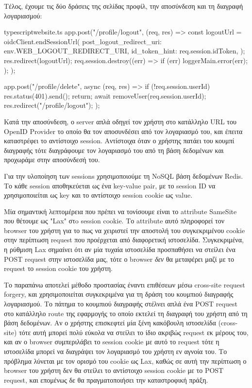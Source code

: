 \documentclass[../thesis.tex]{subfiles}
\begin{document}
Τέλος, έχουμε τις δύο δράσεις της σελίδας προφίλ, την αποσύνδεση και τη διαγραφή λογαριασμού:

\begin{codeblock}{typescript}{website.ts}
  app.post("/profile/logout", (req, res) => {
    const logoutUrl = oidcClient.endSessionUrl({
      post_logout_redirect_uri: env.WEB_LOGOUT_REDIRECT_URI,
      id_token_hint: req.session.idToken,
    });
    res.redirect(logoutUrl);
    req.session.destroy((err) => {
      if (err) loggerMain.error(err);
    });
  });

  app.post("/profile/delete", async (req, res) => {
    if (!req.session.userId) {
      res.status(401).send();
      return;
    }
    await removeUser(req.session.userId);
    res.redirect("/profile/logout");
  });
\end{codeblock}

Κατά την αποσύνδεση, ο server απλά οδηγεί τον χρήστη στο κατάλληλο URL του OpenID Provider το οποίο θα τον αποσυνδέσει από τον λογαριασμό του, και έπειτα καταστρέφει το αντίστοιχο session.
Αντίστοιχα όταν ο χρήστης πατάει του κουμπί διαγραφής τότε διαγράφουμε τον λογαριασμό του από τη βάση δεδομένων και προχωράμε στην αποσύνδεσή του.

\bigskip

Για την υλοποίηση των sessions χρησιμοποιούμε τη NoSQL βάση δεδομένων Redis.
Το κάθε session αποθηκεύεται ως ένα key-value pair, με το session ID να χρησιμοποιείται ως key και το αντίστοιχο session cookie ως value.

Μία σημαντική λεπτομέρεια που πρέπει να τονίσουμε είναι το attribute SameSite που θέτουμε ως "Lax" στo session cookie.
Το attribute αυτό πληροφορεί τον browser του χρήστη για το πως να χειριστεί την αποστολή του συγκεκριμένου cookie στην περίπτωση request που προέρχεται από διαφορετική ιστοσελίδα.
Συγκεκριμένα, η ρύθμιση Lax σημαίνει ότι αν μία τυχαία ιστοσελίδα προσπαθήσει να στείλει ένα POST request στην ιστοσελίδα μας, τότε ο browser \textit{δεν} θα μεταφέρει μαζί με το request το session cookie του χρήστη.

Το παραπάνω αποτελεί μέθοδο προστασίας έναντι επιθέσεων μέσω cross-site request forgery, και χρησιμοποιείται συγκεκριμένα για τη δράση του κουμπιού διαγραφής λογαριασμού.
Το πάτημα το κουμπιού διαγραφής στέλνει απλά ένα POST request στο κατάλληλο route της εφαρμογής το οποίο εκτελεί τη διαγραφή του χρήστη από τη βάση δεδομένων.
Αν ο χρήστης επισκεφτεί μία ξένη κακόβουλη ιστοσελίδα (cross-site) τότε αυτή μπορεί πολύ εύκολα να στείλει το ίδιο ακριβώς request εκ μέρους του, και αν ο browser συμπεριλάβει το session cookie με αυτό το request τότε η ιστοσελίδα μπορεί να διαγράψει τον λογαριασμό του χρήστη εν αγνοία του.
Το πρόβλημα λύνεται με τον ορισμό του cookie ως Lax, καθώς σε αυτή την περίπτωση ο browser του χρήστη δεν θα στείλει το αντίστοιχο session cookie με το POST request, και επομένως δε θα πραγματοποιήσει την καταστροφική πράξη.
\end{document}
